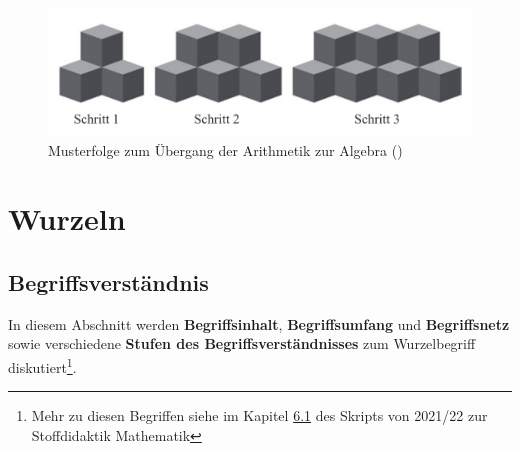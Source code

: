 \documentclass[
]{scrbook}
\theoremstyle{definition}
\theoremstyle{definition}
\theoremstyle{definition}
\theoremstyle{definition}
\theoremstyle{remark}
\begin{document}
\begin{figure}

{\centering \includegraphics[width=0.75\linewidth]{pictures/9-Musterfolge} 

}

\caption{Musterfolge zum Übergang der Arithmetik zur Algebra ()}\label{fig:Musterfolge}
\end{figure}

\section{Wurzeln}\label{wurzeln}

\subsection{Begriffsverständnis}\label{wurzel-begriffsverstaendnis}

In diesem Abschnitt werden \textbf{Begriffsinhalt}, \textbf{Begriffsumfang} und \textbf{Begriffsnetz} sowie verschiedene \textbf{Stufen des Begriffsverständnisses} zum Wurzelbegriff diskutiert\footnote{Mehr zu diesen Begriffen siehe im Kapitel \href{https://stoffdidaktik.heiko-etzold.de/2021/6-begriffsbildung.html}{6.1} des Skripts von 2021/22 zur Stoffdidaktik Mathematik}.
\end{document}
